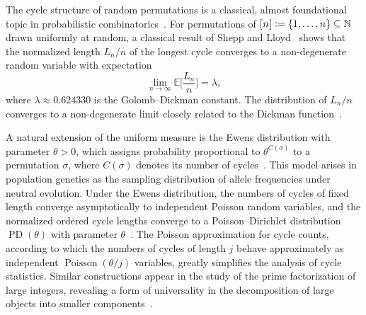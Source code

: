 \documentclass{amsart}
\theoremstyle{definition}
\theoremstyle{remark}
\numberwithin{equation}{section}
\newcommand{\mku}{\mkern1mu}
\newcommand{\deq}{\mathrel{\mathop:}=}
\DeclareMathOperator{\Poi}{Poisson}
\DeclareMathOperator{\PD}{PD}
\begin{document}
The cycle structure of random permutations is a classical, almost foundational topic in probabilistic combinatorics~\cite{Goncharov1944,Touchard1939}. For permutations of $[\mku{n}\mku] \deq \{1,\dots,n\} \subseteq \mathbb{N}$ drawn uniformly at random, a classical result of Shepp and Lloyd~\cite{SheppLLoyd1966} shows that the normalized length $L_{n}/n$ of the longest cycle converges to a non-degenerate random variable with expectation
\begin{equation}
\lim_{n \to \infty} \mathbb{E}\biggl[\frac{L_{n}}{n}\biggr] = \lambda,
\end{equation}
where $\lambda \approx 0.624330$ is the Golomb--Dickman constant.
The distribution of $L_n/n$ converges to a non-degenerate limit closely
related to the Dickman function~\cite{ABT2003}.

A natural extension of the uniform measure is the Ewens distribution with parameter $\theta>0$, which assigns probability proportional to $\theta^{C(\sigma)}$ to a permutation $\sigma$, where $C(\sigma)$ denotes its number of cycles~\cite{Crane2016,Ewens1972,Tavare2021}. This model arises in population genetics as the sampling distribution of allele frequencies under neutral evolution. Under the Ewens distribution, the numbers of cycles of fixed length converge asymptotically to independent Poisson random variables, and the normalized ordered cycle lengths converge to a Poisson--Dirichlet distribution $\PD(\theta)$ with parameter $\theta$~\cite{ABT2003,Arratia1992,Pitman2006}. The Poisson approximation for cycle counts, according to which the numbers of cycles of length $j$ behave approximately as independent $\Poi(\theta/j)$ variables, greatly simplifies the analysis of cycle statistics. Similar constructions appear in the study of the prime factorization of large integers, revealing a form of universality in the decomposition of large objects into smaller components~\cite{Ford2022,TerryTao2013}.
\end{document}
